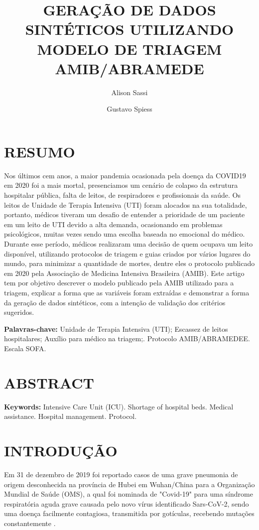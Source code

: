 \documentclass[12pt]{article}
\title{GERAÇÃO DE DADOS SINTÉTICOS UTILIZANDO MODELO DE TRIAGEM AMIB/ABRAMEDE}
\author{Alison Sassi\inst{1} \and Gustavo Spiess\inst{2} }
\begin{document}
\maketitle

\section{RESUMO}

Nos últimos cem anos, a maior pandemia ocasionada pela doença da COVID19 em 2020 foi a mais mortal, presenciamos um cenário de colapso da estrutura hospitalar pública, falta de leitos, de respiradores e profissionais da saúde. Os leitos de Unidade de Terapia Intensiva (UTI) foram alocados na sua totalidade, portanto, médicos tiveram um desafio de entender a prioridade de um paciente em um leito de UTI devido a alta demanda, ocasionando em problemas psicológicos, muitas vezes sendo uma escolha baseada no emocional do médico. Durante esse período, médicos realizaram uma decisão de quem ocupava um leito disponível, utilizando protocolos de triagem e guias criados por vários lugares do mundo, para minimizar a quantidade de mortes, dentre eles o protocolo publicado em 2020 pela Associação de Medicina Intensiva Brasileira (AMIB). Este artigo tem por objetivo descrever o modelo publicado pela AMIB utilizado para a triagem, explicar a forma que as variáveis foram extraídas e demonstrar a forma da geração de dados sintéticos, com a intenção de validação dos critérios sugeridos.

\textbf{Palavras-chave:} Unidade de Terapia Intensiva (UTI); Escassez de leitos hospitalares; Auxílio para médico na triagem;. Protocolo AMIB/ABRAMEDEE. Escala SOFA.

\section{ABSTRACT} 
\textbf{Keywords:} Intensive Care Unit (ICU). Shortage of hospital beds. Medical assistance. Hospital management. Protocol.

\section{INTRODUÇÃO}

Em 31 de dezembro de 2019 foi reportado casos de uma grave pneumonia de origem desconhecida na província de Hubei em Wuhan/China para a Organização Mundial de Saúde (OMS), a qual foi nominada de "Covid-19" para uma síndrome respiratória aguda grave causada pelo novo vírus identificado Sars-CoV-2, sendo uma doença facilmente contagiosa, transmitida por gotículas, recebendo mutações constantemente \cite{sa2020especial}. 
\end{document}
